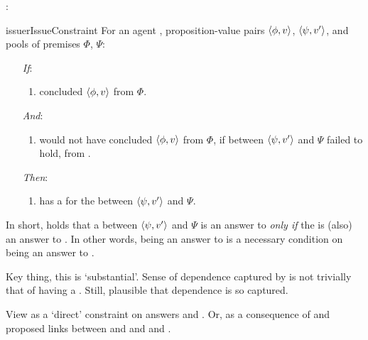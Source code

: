 \begin{note}
  \issueConstraint{}:

  \begin{restatable}[\issueConstraint{}]{issue}{rIssueConstraint}
    \label{issue:has-witnessed}
    For an agent \vAgent{}, proposition-value pairs \(\langle \phi, v \rangle\), \(\langle \psi, v' \rangle\), and pools of premises \(\Phi\), \(\Psi\):

    \begin{enumerate}
    \item[\emph{If}:]
      \begin{enumerate}[label=\alph*., ref=(\alph*)]
      \item \vAgent{} concluded \(\langle \phi, v \rangle\) from \(\Phi\).
      \end{enumerate}
    \item[\emph{And}:]
      \begin{enumerate}[label=\alph*., ref=(\alph*), resume]
      \item
        \vAgent{} would not have concluded \(\langle \phi, v \rangle\) from \(\Phi\), if \support{} between \(\langle \psi, v' \rangle\) and \(\Psi\) failed to hold, from .
      \end{enumerate}
    \item[\emph{Then}:]
      \begin{enumerate}[label=\alph*., ref=(\alph*), resume]
      \item
        \vAgent{} has a  for the \ros{} between \(\langle \psi, v' \rangle\) and \(\Psi\).
      \end{enumerate}
    \end{enumerate}
    \vspace{-\baselineskip}
  \end{restatable}

  In short, \issueConstraint{} holds that a \ros{} between \(\langle \psi, v' \rangle\) and \(\Psi\) is an answer to \qWhyV{} \emph{only if} the \ros{} is (also) an answer to \qHowV{}.
  In other words, being an answer to \qHowV{} is a necessary condition on being an answer to \qWhyV{}.
\end{note}

\begin{note}
  \color{red}
  Key thing, this is `substantial'.
  Sense of dependence captured by \qWhyVnP{} is not trivially that of having a \wit{}.
  Still, plausible that dependence is so captured.
\end{note}

\begin{note}
  View \issueConstraint{} as a `direct' constraint on answers \qWhyVnP{} and \qWhy{}.
  Or, as a consequence of \issueInclusion{} and proposed links between \qWhy{} and \qWhyVnP{} and \qHowV{} and \qHow{}.
\end{note}

